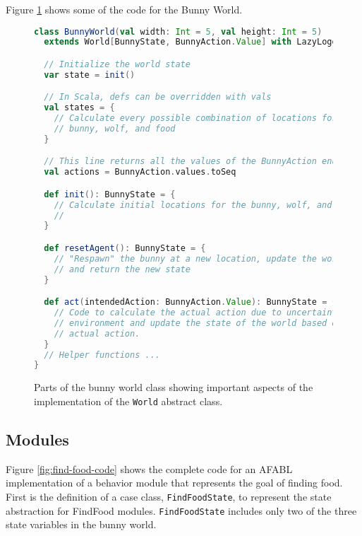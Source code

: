 

Figure \ref{fig:bunny-world-code} shows some of the code for the Bunny World.

\begin{figure}[!h]
\begin{center}
\small
\begin{lstlisting}[language=Scala]
class BunnyWorld(val width: Int = 5, val height: Int = 5)
  extends World[BunnyState, BunnyAction.Value] with LazyLogging {

  // Initialize the world state
  var state = init()

  // In Scala, defs can be overridden with vals
  val states = {
    // Calculate every possible combination of locations for the
    // bunny, wolf, and food
  }

  // This line returns all the values of the BunnyAction enumeration
  val actions = BunnyAction.values.toSeq

  def init(): BunnyState = {
    // Calculate initial locations for the bunny, wolf, and food.
    //
  }

  def resetAgent(): BunnyState = {
    // "Respawn" the bunny at a new location, update the world state
    // and return the new state
  }

  def act(intendedAction: BunnyAction.Value): BunnyState = {
    // Code to calculate the actual action due to uncertainty in the
    // environment and update the state of the world based on the
    // actual action.
  }
  // Helper functions ...
}
\end{lstlisting}
\normalsize
\caption{Parts of the bunny world class showing important aspects of the implementation of the {\tt World} abstract class.}
\end{center}
\label{fig:bunny-world-code}
\end{figure}


\subsection{Modules}\label{sec:afabl-modules}

Figure \ref{fig:find-food-code} shows the complete code for an AFABL implementation of a behavior module that represents the goal of finding food. First is the definition of a case class, {\tt FindFoodState}, to represent the state abstraction for FindFood modules. {\tt FindFoodState} includes only two of the three state variables in the bunny world.


